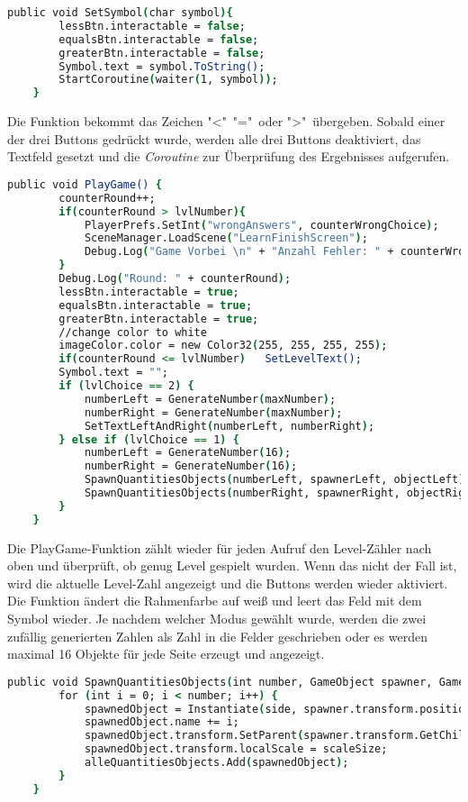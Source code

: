 \begin{lstlisting}[language=csh, caption={GameQuantities.cs SetSymbol-Funktion}]
	public void SetSymbol(char symbol){
		lessBtn.interactable = false;
		equalsBtn.interactable = false;
		greaterBtn.interactable = false;
		Symbol.text = symbol.ToString();
		StartCoroutine(waiter(1, symbol));
	}
\end{lstlisting}
Die Funktion bekommt das Zeichen "<"\, "="\ oder ">"\ übergeben. Sobald einer der drei Buttons gedrückt wurde, werden alle drei Buttons deaktiviert, das Textfeld gesetzt und die \textit{Coroutine} zur Überprüfung des Ergebnisses aufgerufen.\\
\begin{lstlisting}[language=csh, caption={GameQuantities.cs PlayGame-Funktion}]
	public void PlayGame() {
		counterRound++;
		if(counterRound > lvlNumber){
			PlayerPrefs.SetInt("wrongAnswers", counterWrongChoice);
			SceneManager.LoadScene("LearnFinishScreen");
			Debug.Log("Game Vorbei \n" + "Anzahl Fehler: " + counterWrongChoice);
		}
		Debug.Log("Round: " + counterRound);
		lessBtn.interactable = true;
		equalsBtn.interactable = true;
		greaterBtn.interactable = true;
		//change color to white
		imageColor.color = new Color32(255, 255, 255, 255);
		if(counterRound <= lvlNumber)	SetLevelText();
		Symbol.text = "";
		if (lvlChoice == 2) {
			numberLeft = GenerateNumber(maxNumber);
			numberRight = GenerateNumber(maxNumber);
			SetTextLeftAndRight(numberLeft, numberRight);
		} else if (lvlChoice == 1) {
			numberLeft = GenerateNumber(16);
			numberRight = GenerateNumber(16);
			SpawnQuantitiesObjects(numberLeft, spawnerLeft, objectLeft);
			SpawnQuantitiesObjects(numberRight, spawnerRight, objectRight);
		}
	}
\end{lstlisting}
Die PlayGame-Funktion zählt wieder für jeden Aufruf den Level-Zähler nach oben und überprüft, ob genug Level gespielt wurden. Wenn das nicht der Fall ist, wird die aktuelle Level-Zahl angezeigt und die Buttons werden wieder aktiviert. Die Funktion ändert die Rahmenfarbe auf weiß und leert das Feld mit dem Symbol wieder. Je nachdem welcher Modus gewählt wurde, werden die zwei zufällig generierten Zahlen als Zahl in die Felder geschrieben oder es werden maximal 16 Objekte für jede Seite erzeugt und angezeigt.\\
\begin{lstlisting}[language=csh, caption={GameQuantities.cs SpawnQuantitiesObjects-Funktion}]
	public void SpawnQuantitiesObjects(int number, GameObject spawner, GameObject side) {
		for (int i = 0; i < number; i++) {
			spawnedObject = Instantiate(side, spawner.transform.position, Quaternion.identity);
			spawnedObject.name += i;
			spawnedObject.transform.SetParent(spawner.transform.GetChild(i / 4));
			spawnedObject.transform.localScale = scaleSize;
			alleQuantitiesObjects.Add(spawnedObject);
		}
	}
\end{lstlisting}
